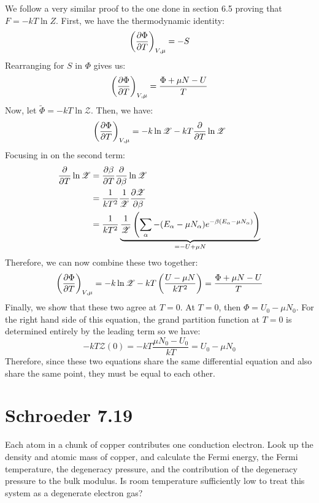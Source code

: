 \documentclass[10pt]{article}
\begin{document}
\begin{enumerate}[label=\alph*)]
			\begin{solution}
				We follow a very similar proof to the one done in section 6.5 proving that \( F = -kT \ln Z \).
				First, we have the thermodynamic identity:
				\[
					\left( \pdv{\Phi}{T} \right)_{V, \mu} = -S
				\] 
				Rearranging for \( S \) in \( \Phi \) gives us:
				\[
					\left( \pdv{\Phi}{T} \right)_{V, \mu} = \frac{\Phi + \mu N - U}{T}
				\] 
				Now, let \( \tilde \Phi = -kT \ln \mathscr Z \). Then, we have:
				\[
					\left( \pdv{\Phi}{T} \right)_{V, \mu} = -k \ln \mathscr Z - kT \pdv{T} \ln \mathscr Z
				\] 
				Focusing in on the second term:
				\begin{align*}
					\pdv{T} \ln \mathscr Z &= \pdv{\beta}{T} \pdv{\beta} \ln \mathscr Z\\
										   &= \frac{1}{kT^2} \frac{1}{\mathscr Z} \pdv{\mathscr Z}{\beta} \\
										   &= \frac{1}{kT^2}\underbrace{\frac{1}{\mathscr Z}
										   \left( \sum_{\alpha}-(E_\alpha - \mu N_\alpha) 
									   e^{-\beta(E_\alpha - \mu N_\alpha)}\right)}_{= -U + \mu N}  
				\end{align*}	
				Therefore, we can now combine these two together:
				\[
					\left( \pdv{\Phi}{T} \right)_{V, \mu} = 
					-k \ln \mathscr Z - kT\left( \frac{U - \mu N}{kT^2} \right) = \frac{\Phi + \mu N - U}{T}
				\] 
				Finally, we show that these two agree at \( T = 0 \). At \( T = 0 \), then 
				\( \Phi = U_0 - \mu N_0\). For the right hand side of this equation, the grand partition
				function at \( T = 0 \) is determined entirely by the leading term so we have:
				\[
				-kT \mathscr Z(0) = -kT \frac{\mu N_0 - U_0}{kT} = U_0 - \mu N_0
				\] 
				Therefore, since these two equations share the same differential equation and also share the 
				same point, they must be equal to each other. 
			\end{solution}
	\end{enumerate}
	\pagebreak
	\section*{Schroeder 7.19}
	Each atom in a chunk of copper contributes one conduction electron. Look up the density and atomic mass 
	of copper, and calculate the Fermi energy, the Fermi temperature, the degeneracy pressure, and the 
	contribution of the degeneracy pressure to the bulk modulus. Is room temperature sufficiently low 
	to treat this system as a degenerate electron gas?
\end{document}

